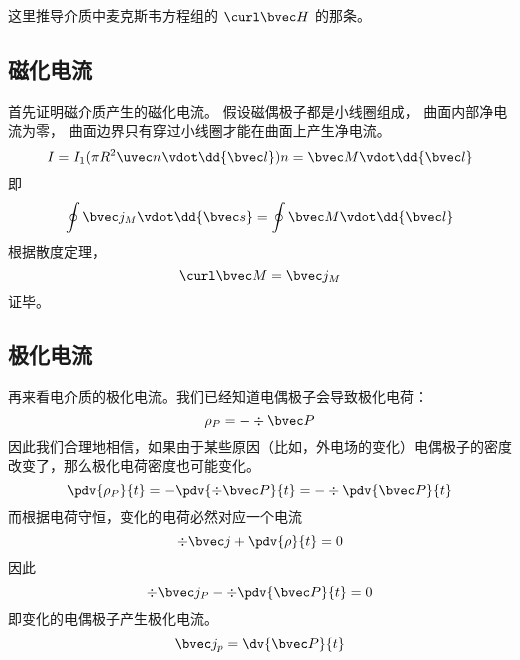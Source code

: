 


这里推导介质中麦克斯韦方程组的 $\curl \bvec H$ 的那条。

\subsection{磁化电流}
首先证明磁介质产生的磁化电流。 假设磁偶极子都是小线圈组成， 曲面内部净电流为零， 曲面边界只有穿过小线圈才能在曲面上产生净电流。
\begin{equation}
I = I_1 (\pi R^2 \uvec n \vdot \dd{\bvec l}) n = \bvec M \vdot \dd{\bvec l}
\end{equation}
即
\begin{equation}
\oint \bvec j_M \vdot \dd{\bvec s} = \oint \bvec M \vdot \dd{\bvec l}
\end{equation}
根据散度定理，
\begin{equation}
\curl \bvec M = \bvec j_M
\end{equation}
证毕。

\subsection{极化电流}
再来看电介质的极化电流。我们已经知道电偶极子会导致极化电荷：
$$\rho_P=-\div \bvec P$$
因此我们合理地相信，如果由于某些原因（比如，外电场的变化）电偶极子的密度改变了，那么极化电荷密度也可能变化。
$$\pdv{\rho_P}{t}=-\pdv{\div \bvec P}{t}=-\div \pdv{\bvec P}{t}$$
而根据电荷守恒，变化的电荷必然对应一个电流
$$\div \bvec j + \pdv{\rho}{t}=0$$
因此
$$
\div \bvec j_P -\div \pdv{\bvec P}{t}=0
$$
即变化的电偶极子产生极化电流。
\begin{equation}
\bvec j_p = \dv{\bvec P}{t}
\end{equation}


